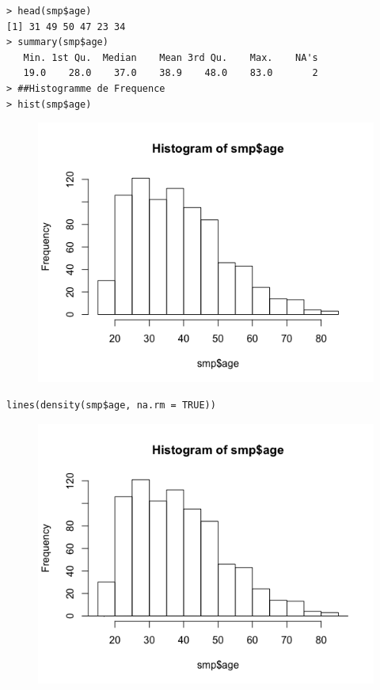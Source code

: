 \begin{lstlisting}[language=html]
> head(smp$age)
[1] 31 49 50 47 23 34
> summary(smp$age)
   Min. 1st Qu.  Median    Mean 3rd Qu.    Max.    NA's 
   19.0    28.0    37.0    38.9    48.0    83.0       2 
> ##Histogramme de Frequence
> hist(smp$age)
\end{lstlisting}

\begin{figure}[H]\begin{center}\includegraphics[scale=1]{ilu/lab2-4.png}\end{center}\end{figure}

\begin{lstlisting}[language=html]
lines(density(smp$age, na.rm = TRUE))
\end{lstlisting}

\begin{figure}[H]\begin{center}\includegraphics[scale=1]{ilu/lab2-5.png}\end{center}\end{figure}

